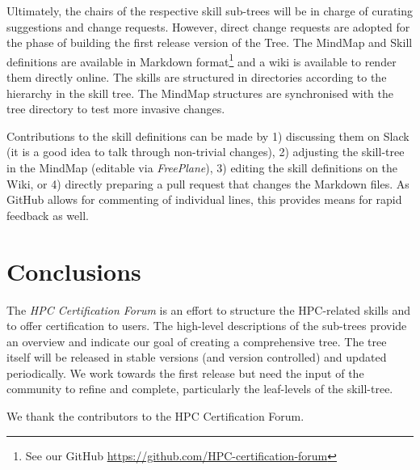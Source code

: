 \documentclass[jocse]{jocseart}
\begin{document}
Ultimately, the chairs of the respective skill sub-trees will be in charge of curating suggestions and change requests. However, direct change requests are adopted for the phase of building the first release version of the Tree.
The MindMap and Skill definitions are available in Markdown format\footnote{See our GitHub \url{https://github.com/HPC-certification-forum}} and a wiki is available to render them directly online.
The skills are structured in directories according to the hierarchy in the skill tree.
The MindMap structures are synchronised with the tree directory to test more invasive changes.

Contributions to the skill definitions can be made by 1) discussing them on Slack (it is a good idea to talk through non-trivial changes), 2) adjusting the skill-tree in the MindMap (editable via \textit{FreePlane}), 3) editing the skill definitions on the Wiki, or 4) directly preparing a pull request that changes the Markdown files.
As GitHub allows for commenting of individual lines, this provides means for rapid feedback as well.

\section{Conclusions}

The \textit{HPC Certification Forum} is an effort to structure the HPC-related skills and to offer certification to users.
The high-level descriptions of the sub-trees provide an overview and indicate our goal of creating a comprehensive tree.
The tree itself will be released in stable versions (and version controlled) and updated periodically.
We work towards the first release but need the input of the community to refine and complete, particularly the leaf-levels of the skill-tree.


\begin{acks}
\small We thank the contributors to the HPC Certification Forum.
\end{acks}

%
%
\end{document}
